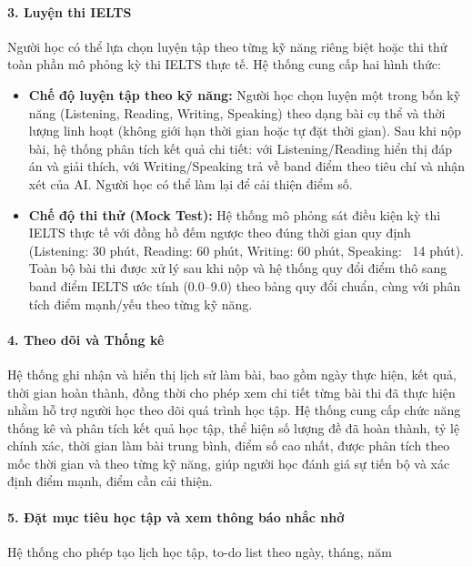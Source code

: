 \documentclass[a4paper,12pt]{extreport}
\begin{document}
\paragraph{3. Luyện thi IELTS}
Người học có thể lựa chọn luyện tập theo từng kỹ năng riêng biệt hoặc thi thử toàn phần mô phỏng kỳ thi IELTS thực tế. Hệ thống cung cấp hai hình thức:
\begin{itemize}
    \item \textbf{Chế độ luyện tập theo kỹ năng:} Người học chọn luyện một trong bốn kỹ năng (Listening, Reading, Writing, Speaking) theo dạng bài cụ thể và thời lượng linh hoạt (không giới hạn thời gian hoặc tự đặt thời gian). Sau khi nộp bài, hệ thống phân tích kết quả chi tiết: với Listening/Reading hiển thị đáp án và giải thích, với Writing/Speaking trả về band điểm theo tiêu chí và nhận xét của AI. Người học có thể làm lại để cải thiện điểm số.
    \item \textbf{Chế độ thi thử (Mock Test):} Hệ thống mô phỏng sát điều kiện kỳ thi IELTS thực tế với đồng hồ đếm ngược theo đúng thời gian quy định (Listening: 30 phút, Reading: 60 phút, Writing: 60 phút, Speaking: ~14 phút). Toàn bộ bài thi được xử lý sau khi nộp và hệ thống quy đổi điểm thô sang band điểm IELTS ước tính (0.0–9.0) theo bảng quy đổi chuẩn, cùng với phân tích điểm mạnh/yếu theo từng kỹ năng.
\end{itemize}

\paragraph{4. Theo dõi và Thống kê}
Hệ thống ghi nhận và hiển thị lịch sử làm bài, bao gồm ngày thực hiện, kết quả, thời gian hoàn thành, đồng thời cho phép xem chi tiết từng bài thi đã thực hiện nhằm hỗ trợ người học theo dõi quá trình học tập. 
Hệ thống cung cấp chức năng thống kê và phân tích kết quả học tập, thể hiện số lượng đề đã hoàn thành, tỷ lệ chính xác, thời gian làm bài trung bình, điểm số cao nhất, được phân tích theo mốc thời gian và theo từng kỹ năng, giúp người học đánh giá sự tiến bộ và xác định điểm mạnh, điểm cần cải thiện. 

\paragraph{5. Đặt mục tiêu học tập và xem thông báo nhắc nhở }
Hệ thống cho phép tạo lịch học tập, to-do list theo ngày, tháng, năm

\end{document}
